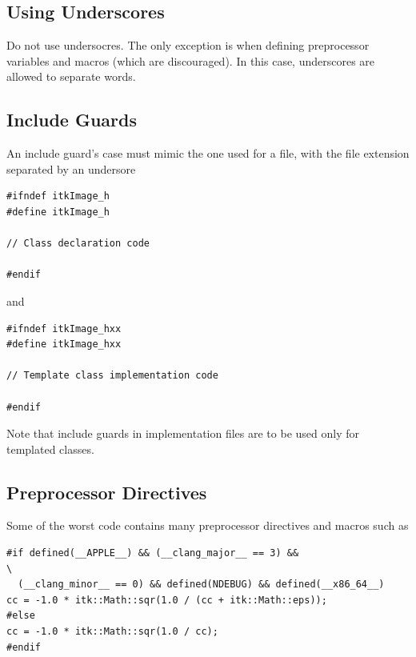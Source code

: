 \subsection{Using Underscores}%
\label{subsec:UsingUnderscores}

Do not use undersocres. The only exception is when defining preprocessor
variables and macros (which are discouraged). In this case, underscores are
allowed to separate words.


\subsection{Include Guards}%
\label{subsec:Include Guards}

An include guard's case must mimic the one used for a file, with the file
extension separated by an undersore

\small
\begin{verbatim}
#ifndef itkImage_h
#define itkImage_h

// Class declaration code

#endif
\end{verbatim}
\normalsize

and

\small
\begin{verbatim}
#ifndef itkImage_hxx
#define itkImage_hxx

// Template class implementation code

#endif
\end{verbatim}
\normalsize

Note that include guards in implementation files are to be used only for templated classes.


\subsection{Preprocessor Directives}%
\label{subsec:PreprocessorDirectives}

Some of the worst code contains many preprocessor directives and macros such as

\small
\begin{verbatim}
#if defined(__APPLE__) && (__clang_major__ == 3) &&                          \
  (__clang_minor__ == 0) && defined(NDEBUG) && defined(__x86_64__)
cc = -1.0 * itk::Math::sqr(1.0 / (cc + itk::Math::eps));
#else
cc = -1.0 * itk::Math::sqr(1.0 / cc);
#endif
\end{verbatim}
\normalsize

